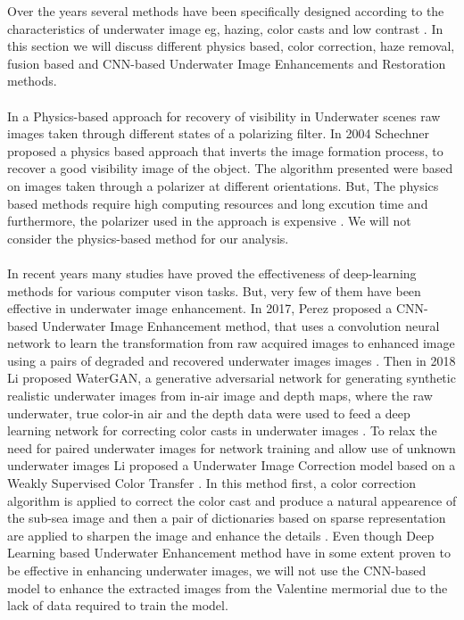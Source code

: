 \documentclass[a4paper,11pt,oneside]{article}
\begin{document}
  Over the years several methods have been specifically designed according to the characteristics of underwater image eg, hazing, color casts and low contrast \cite{15}. In this section we will discuss different physics based, color correction, haze removal, fusion based and CNN-based Underwater Image Enhancements and Restoration methods.\\
  \\
  In a Physics-based approach for recovery of visibility in Underwater scenes raw images taken through different states of a polarizing filter. In 2004 Schechner \cite{19} proposed a physics based approach that inverts the image formation process, to recover a good visibility image of the object. The algorithm presented were based on images taken through a polarizer at different orientations. But, The physics based methods require high computing resources and long excution time and furthermore, the polarizer used in the approach is expensive \cite{8}. We will not consider the physics-based method for our analysis.\\
  \\
  In recent years many studies have proved the effectiveness of deep-learning methods for various computer vison tasks. But, very few of them have been effective in underwater image enhancement. In 2017, Perez \cite{22} proposed a CNN-based Underwater Image Enhancement method, that uses a convolution neural network to learn the transformation from raw acquired images to enhanced image using a pairs of degraded and recovered underwater images images \cite{15}. Then in 2018 Li \cite{23} proposed WaterGAN, a generative adversarial network for generating synthetic realistic underwater images from in-air image and depth maps, where the raw underwater, true color-in air and the depth data were used to feed a deep learning network for correcting color casts in underwater images \cite{15}. To relax the need for paired underwater images for network training and allow use of unknown underwater images Li \cite{7} proposed a Underwater Image Correction model based on a Weakly Supervised Color Transfer \cite{15}. In this method first, a color correction algorithm is applied to correct the color cast and produce a natural appearence of the sub-sea image and then a pair of dictionaries based on sparse representation are applied to sharpen the image and enhance the details \cite{7}. Even though Deep Learning based Underwater Enhancement method have in some extent proven to be effective in enhancing underwater images, we will not use the CNN-based model to enhance the extracted images from the Valentine mermorial due to the lack of data required to train the model.\\
\end{document}
